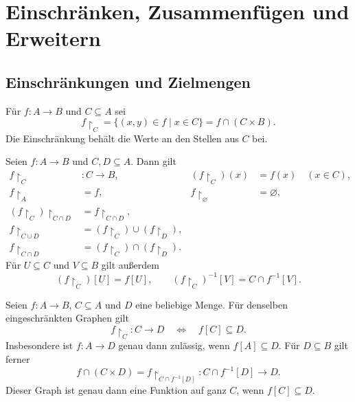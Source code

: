 \chapter{Einschränken, Zusammenfügen und Erweitern}
\label{b05guide:ch:restrictions}

\section{Einschränkungen und Zielmengen}

\begin{definition}
\label{b05guide:def:restriction}
Für $f\colon A\to B$ und $C\subseteq A$ sei
\[
 f\restriction_C
   =\{(x,y)\in f\mid x\in C\}
   =f\cap(C\times B).
\]
Die Einschränkung behält die Werte an den Stellen aus $C$ bei.
\end{definition}

\begin{theorem}
\label{b05guide:thm:restriction-laws}
Seien $f\colon A\to B$ und $C,D\subseteq A$. Dann gilt
\[
 \begin{aligned}
 f\restriction_C&\colon C\to B,&
 (f\restriction_C)(x)&=f(x)\quad(x\in C),\\
 f\restriction_A&=f,& f\restriction_\varnothing&=\varnothing,\\
 (f\restriction_C)\restriction_{C\cap D}
    &=f\restriction_{C\cap D},\\
 f\restriction_{C\cup D}
    &=(f\restriction_C)\cup(f\restriction_D),\\
 f\restriction_{C\cap D}
    &=(f\restriction_C)\cap(f\restriction_D).
 \end{aligned}
\]
Für $U\subseteq C$ und $V\subseteq B$ gilt außerdem
\[
 (f\restriction_C)[U]=f[U],\qquad
 (f\restriction_C)^{-1}[V]=C\cap f^{-1}[V].
\]
\end{theorem}

\begin{theorem}
\label{b05guide:thm:restriction-target}
Seien $f\colon A\to B$, $C\subseteq A$ und $D$ eine beliebige Menge.
Für denselben eingeschränkten Graphen gilt
\[
 f\restriction_C\colon C\to D
 \quad\Longleftrightarrow\quad f[C]\subseteq D.
\]
Insbesondere ist $f\colon A\to D$ genau dann zulässig,
wenn $f[A]\subseteq D$. Für $D\subseteq B$ gilt ferner
\[
 f\cap(C\times D)
   =f\restriction_{C\cap f^{-1}[D]}
   \colon C\cap f^{-1}[D]\to D.
\]
Dieser Graph ist genau dann eine Funktion auf ganz $C$,
wenn $f[C]\subseteq D$.
\end{theorem}

